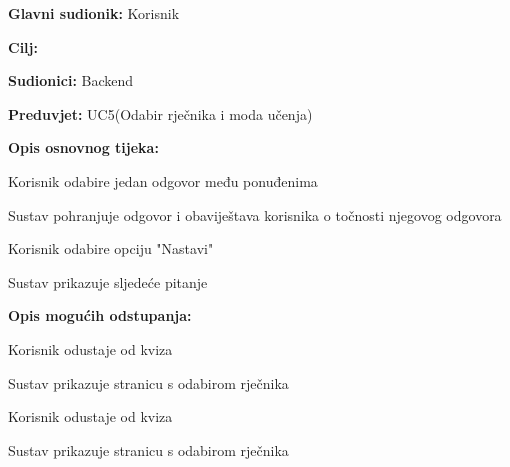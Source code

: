 					\noindent {}
					\begin{packed_item}
						
						\item \textbf{Glavni sudionik: } Korisnik
						\item  \textbf{Cilj:} 
						\item  \textbf{Sudionici:} Backend
						\item  \textbf{Preduvjet:} UC5(Odabir rječnika i moda učenja)
						\item  \textbf{Opis osnovnog tijeka:}
						
						\item[] \begin{packed_enum}
							
							\item Korisnik odabire jedan odgovor među ponuđenima
							\item Sustav pohranjuje odgovor i obaviještava korisnika o točnosti njegovog odgovora
							\item Korisnik odabire opciju "Nastavi"
							\item Sustav prikazuje sljedeće pitanje
						\end{packed_enum}
						
						\item  \textbf{Opis mogućih odstupanja:}
						
						\item[] \begin{packed_item}
							
							\item[3.a] Korisnik odustaje od kviza
							\item[] \begin{packed_enum}
								
								\item Sustav prikazuje stranicu s odabirom rječnika
								
							\end{packed_enum}
							
							\item[4.a] Korisnik odustaje od kviza 
							\item[] \begin{packed_enum}
								
								\item Sustav prikazuje stranicu s odabirom rječnika
								
							\end{packed_enum}
							
						\end{packed_item}
					\end{packed_item}
					

